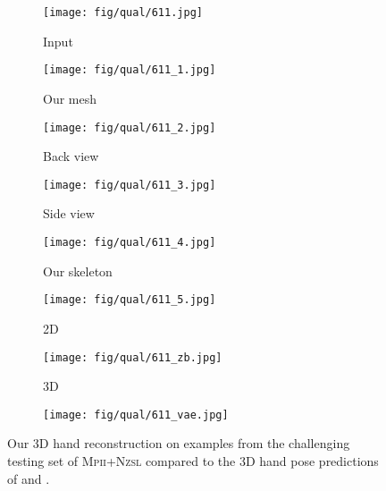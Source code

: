 \documentclass[10pt,twocolumn,letterpaper]{article}
\newcommand{\sz}{0.102}
\newcommand{\szl}{0.067}
\newcommand{\szm}{-30pt}
\begin{document}
\begin{figure*}[t]
\begin{subfigure}[c]{\sz\linewidth}
\texttt{[image: fig/qual/611.jpg]}
\caption{\scriptsize Input}
\label{fig:qual_input}
\end{subfigure}
\begin{subfigure}[c]{\sz\linewidth}
\texttt{[image: fig/qual/611\_1.jpg]}
\caption{\scriptsize Our mesh}
\label{fig:qual_o1}
\end{subfigure}
\begin{subfigure}[c]{\sz\linewidth}
\texttt{[image: fig/qual/611\_2.jpg]}
\caption{\scriptsize Back view}
\label{fig:qual_o2}
\end{subfigure}
\begin{subfigure}[c]{\sz\linewidth}
\texttt{[image: fig/qual/611\_3.jpg]}
\caption{\scriptsize Side view}
\label{fig:qual_o3}
\end{subfigure}
\begin{subfigure}[c]{\sz\linewidth}
\texttt{[image: fig/qual/611\_4.jpg]}
\caption{\scriptsize Our skeleton}
\label{fig:qual_o4}
\end{subfigure}
\hspace{3pt}
\begin{subfigure}[c]{\sz\linewidth}
\texttt{[image: fig/qual/611\_5.jpg]}
\caption{\scriptsize\scriptsize\cite{zimmermann2017learning}2D}
\label{fig:qual_z2}
\end{subfigure}
\begin{subfigure}[c]{\szl\linewidth}
\texttt{[image: fig/qual/611\_zb.jpg]}
\caption{\scriptsize\cite{zimmermann2017learning}3D}
\label{fig:qual_z3}
\end{subfigure}
\hspace{3pt}
\begin{subfigure}[c]{\szl\linewidth}
\texttt{[image: fig/qual/611\_vae.jpg]}
\caption{\scriptsize\cite{spurr2018cross}}
\label{fig:qual_s}
\end{subfigure}

\vspace{-7pt}

\caption{Our 3D hand reconstruction on examples from the challenging testing set of \textsc{Mpii+Nzsl} compared to the 3D hand pose predictions of \cite{zimmermann2017learning} and \cite{spurr2018cross}.}
\label{fig:qual}

\vspace{\szm}

\end{figure*} 
\end{document}
